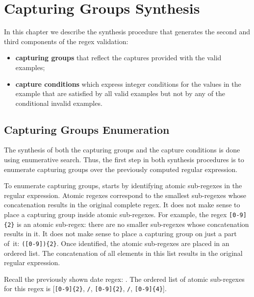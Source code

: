 \chapter{Capturing Groups Synthesis}\label{chap:capture-cond-synthesis}


In this chapter we describe the synthesis procedure that generates the second and third components of the regex validation:
\begin{itemize}
    \item \textbf{capturing groups} that reflect the captures provided with the valid examples;
    \item \textbf{capture conditions} which express integer conditions for the values in the example that are satisfied by all valid examples but not by any of the conditional invalid examples. 
\end{itemize}

    
\section{Capturing Groups Enumeration}\label{sec:cap_groups_enumeration}
The synthesis of both the capturing groups and the capture conditions is done using enumerative search. Thus, the first step in both synthesis procedures is to enumerate capturing groups over the previously computed regular expression.

To enumerate capturing groups, \Forest starts by identifying atomic sub-regexes in the regular expression.
Atomic regexes correspond to the smallest sub-regexes whose concatenation results in the original complete regex.
It does not make sense to place a capturing group inside atomic sub-regexes. For example, the regex \verb![0-9]{2}! is an atomic sub-regex: there are no smaller sub-regexes whose concatenation results in it. It does not make sense to place a capturing group on just a part of~it: \verb!([0-9]){2}!.
Once identified, the atomic sub-regexes are placed in an ordered list. The concatenation of all elements in this list results in the original regular expression.

\begin{example}
Recall the previously shown date regex: . The ordered list of atomic sub-regexes for this regex is [\verb![0-9]{2}!, \verb!/!, \verb![0-9]{2}!, \verb!/!, \verb![0-9]{4}!].
\end{example}

